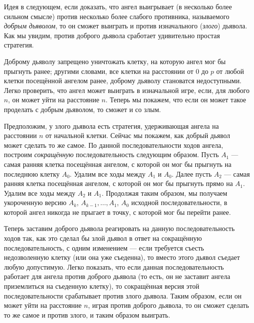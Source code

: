Идея в следующем, если доказать, что ангел выигрывает (в несколько более сильном смысле) против несколько более слабого противника, называемого \emph{добрым дьяволом}, то он сможет выиграть и против изначального (\emph{злого}) дьявола.
Как мы увидим, против доброго дьявола сработает удивительно простая стратегия.

Доброму дьяволу запрещено уничтожать клетку, на которую ангел мог бы прыгнуть ранее;
другими словами, все клетки на расстоянии от $0$ до $p$ от любой клетки посещённой ангелом ранее, доброму дьяволу становатся недоступными.
Легко проверить, что ангел может выиграть в изначальной игре, если, для любого $n$, он может уйти на расстояние $n$.
Теперь мы покажем, что если он может такое проделать с добрым дьяволом, то сможет и со злым.

Предположим, у злого дьявола есть стратегия, удерживающая ангела на расстоянии $n$ от начальной клетки.
Сейчас мы покажем, как добрый дьявол может сделать то же самое.
По данной последовательности ходов ангела, построим \emph{сокращённую} последовательность следующим образом.
Пусть $A_1$ --- самая ранняя клетка посещённая ангелом, с которой он мог бы прыгнуть на последнюю клетку $A_0$.
Удалим все ходы между $A_1$ и $A_0$.
Далее пусть $A_2$ --- самая ранняя клетка посещённая ангелом, с которой он мог бы прыгнуть прямо на $A_1$.
Удалим все ходы между $A_2$ и $A_1$.
Продолжая таким образом, мы получаем укороченную версию $A_k$, $A_{k-1}, \dots, A_1$, $A_0$ исходной последовательности, в которой ангел никогда не прыгает в точку, с которой мог бы перейти ранее.

Теперь заставим доброго дьявола реагировать на данную последовательность ходов так, как это сделал бы злой дьявол в ответ на сокращённую последовательность, с одним изменением --- если требуется съесть недозволенную клетку (или она уже съеденна), то вместо этого дьявол съедает любую допустимую.
Легко показать, что если данная последовательность работает для ангела против доброго дьявола (то есть, он не заставит ангела приземлиться на съеденную клетку), то сокращённая версия этой последовательности срабатывает против злого дьявола.
Таким образом, если он может уйти на расстояние $n$, играя против доброго дьявола, то он сможет сделать то же самое и против злого, и таким образом выиграть.

